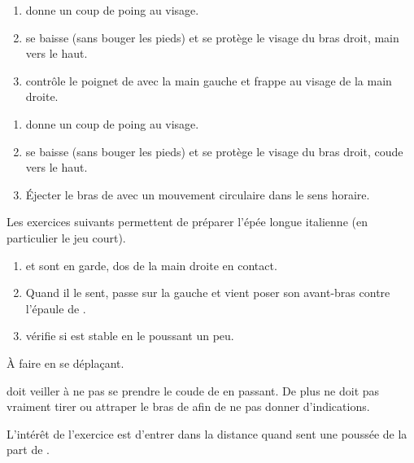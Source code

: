 \begin{exercice}
	\label{mains-nues:ex:enzi-3}

	\begin{enumerate}
		\item \A donne un coup de poing au visage.
		\item \D se baisse (sans bouger les pieds) et se protège le visage du bras droit, main vers le haut.
		\item \D contrôle le poignet de \A avec la main gauche et frappe au visage de la main droite.
	\end{enumerate}

\end{exercice}


\begin{exercice}
	\label{mains-nues:ex:enzi-4}

	\begin{enumerate}
		\item \A donne un coup de poing au visage.
		\item \D se baisse (sans bouger les pieds) et se protège le visage du bras droit, coude vers le haut.
		\item Éjecter le bras de \A avec un mouvement circulaire dans le sens horaire.
	\end{enumerate}

\end{exercice}
\bigskip

Les exercices suivants permettent de préparer l'épée longue italienne (en particulier le jeu court).


\begin{exercice}

	\begin{enumerate}
		\item \A et \D sont en garde, dos de la main droite en contact.
		
		\item Quand il le sent, \A passe sur la gauche et vient poser son avant-bras contre l'épaule de \D.
		
		\item \D vérifie si \A est stable en le poussant un peu.
	\end{enumerate}

	À faire en se déplaçant.

	\A doit veiller à ne pas se prendre le coude de \D en passant.
	De plus \A ne doit pas vraiment tirer ou attraper le bras de \D afin de ne pas donner d'indications.

	L'intérêt de l'exercice est d'entrer dans la distance quand \A sent une poussée de la part de \D.

\end{exercice}


